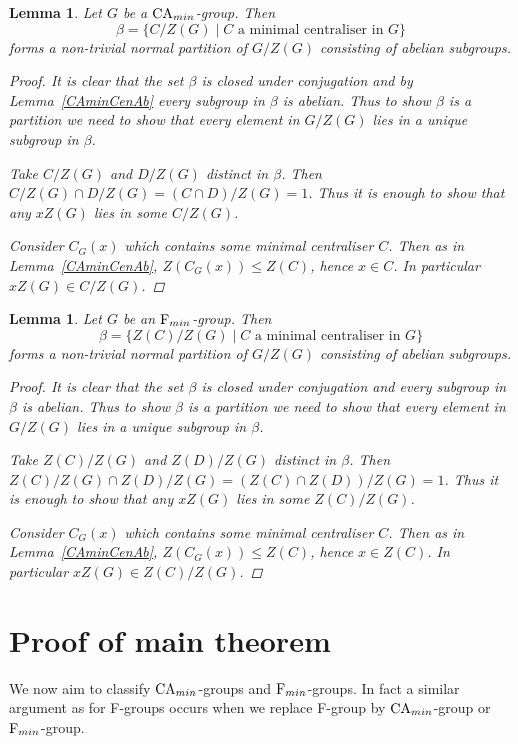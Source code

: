 \documentclass[a4paper,11pt]{article}
\theoremstyle{plain}
\newtheorem{lm}[thm]{Lemma}
\numberwithin{thm}{section}
\begin{document}
\begin{lm}
Let $G$ be a ${\rm CA}_{min}$-group.
Then 
\[
\beta  = \{C/Z(G) \mid C \text{ a minimal centraliser in $G$}\}
\]
forms a non-trivial normal partition of $G/Z(G)$ consisting of abelian subgroups.
\begin{proof}
It is clear that the set $\beta$ is closed under conjugation and by Lemma~\ref{CAminCenAb} every subgroup in $\beta$ is abelian.
Thus to show $\beta$ is a partition we need to show that every element in $G/Z(G)$ lies in a unique subgroup in $\beta$.

Take $C/Z(G)$ and $D/Z(G)$ distinct in $\beta$.
Then $C/Z(G)\cap D/Z(G)=(C\cap D)/Z(G)=1$.
Thus it is enough to show that any $xZ(G)$ lies in some $C/Z(G)$.

Consider $C_G(x)$ which contains some minimal centraliser $C$. 
Then as in Lemma~\ref{CAminCenAb}, $Z(C_G(x))\leq Z(C)$, hence $x\in C$.
In particular $xZ(G)\in C/Z(G)$.
\end{proof}
\end{lm}

\begin{lm}
Let $G$ be an ${\rm F}_{min}$-group.
Then 
\[
\beta  = \{Z(C)/Z(G) \mid C \text{ a minimal centraliser in $G$}\}
\]
forms a non-trivial normal partition of $G/Z(G)$ consisting of abelian subgroups.
\begin{proof}
It is clear that the set $\beta$ is closed under conjugation and every subgroup in $\beta$ is abelian.
Thus to show $\beta$ is a partition we need to show that every element in $G/Z(G)$ lies in a unique subgroup in $\beta$.

Take $Z(C)/Z(G)$ and $Z(D)/Z(G)$ distinct in $\beta$.
Then $Z(C)/Z(G)\cap Z(D)/Z(G)=(Z(C)\cap Z(D))/Z(G)=1$.
Thus it is enough to show that any $xZ(G)$ lies in some $Z(C)/Z(G)$.

Consider $C_G(x)$ which contains some minimal centraliser $C$. 
Then as in Lemma~\ref{CAminCenAb}, $Z(C_G(x))\leq Z(C)$, hence $x\in Z(C)$.
In particular $xZ(G)\in Z(C)/Z(G)$.
\end{proof}
\end{lm}


\section{Proof of main theorem}

We now aim to classify ${\rm CA}_{min}$-groups and ${\rm F}_{min}$-groups.
In fact a similar argument as for F-groups occurs when we replace F-group by ${\rm CA}_{min}$-group or ${\rm F}_{min}$-group.
\end{document}

